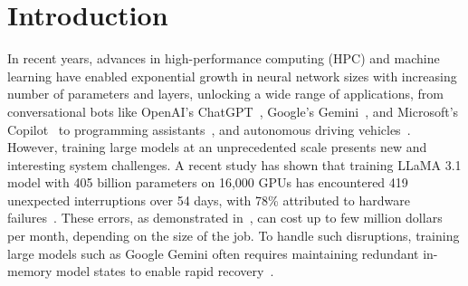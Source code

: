 \section{Introduction}%
In recent years, advances in high-performance computing (HPC) and machine learning have enabled exponential growth in neural network sizes with increasing number of parameters and layers, unlocking a wide range of applications, from conversational bots like OpenAI's ChatGPT~\cite{chatgpt}, Google's Gemini~\cite{team2024gemini}, and Microsoft's Copilot~\cite{copilot} to programming assistants~\cite{chen2021evaluating, microsoft2023github, roziere2024code}, and autonomous driving vehicles~\cite{kiran2022deep,ma2023dolphins}. However, training large models at an unprecedented scale presents new and interesting system challenges. A recent study has shown that training LLaMA 3.1 model with 405 billion parameters on 16,000 GPUs has encountered 419 unexpected interruptions over 54 days, with 78\% attributed to hardware failures~\cite{dubey2024llama}.
These errors, as demonstrated in~\cite{gupta2024just}, can cost up to few million dollars per month, depending on the size of the job. To handle such disruptions, training large models such as Google Gemini often requires maintaining redundant in-memory model states to enable rapid recovery~\cite{team2024gemini}.




